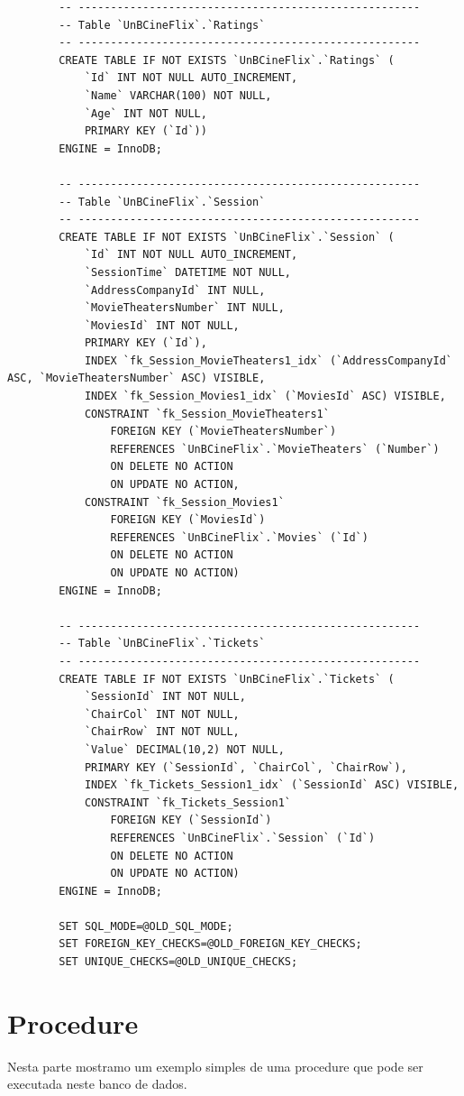 \documentclass[a4paper,10pt]{article}
\begin{document}
\begin{lstlisting}
		-- -----------------------------------------------------
		-- Table `UnBCineFlix`.`Ratings`
		-- -----------------------------------------------------
		CREATE TABLE IF NOT EXISTS `UnBCineFlix`.`Ratings` (
			`Id` INT NOT NULL AUTO_INCREMENT,
			`Name` VARCHAR(100) NOT NULL,
			`Age` INT NOT NULL,
			PRIMARY KEY (`Id`))
		ENGINE = InnoDB;

		-- -----------------------------------------------------
		-- Table `UnBCineFlix`.`Session`
		-- -----------------------------------------------------
		CREATE TABLE IF NOT EXISTS `UnBCineFlix`.`Session` (
			`Id` INT NOT NULL AUTO_INCREMENT,
			`SessionTime` DATETIME NOT NULL,
			`AddressCompanyId` INT NULL,
			`MovieTheatersNumber` INT NULL,
			`MoviesId` INT NOT NULL,
			PRIMARY KEY (`Id`),
			INDEX `fk_Session_MovieTheaters1_idx` (`AddressCompanyId` ASC, `MovieTheatersNumber` ASC) VISIBLE,
			INDEX `fk_Session_Movies1_idx` (`MoviesId` ASC) VISIBLE,
			CONSTRAINT `fk_Session_MovieTheaters1`
				FOREIGN KEY (`MovieTheatersNumber`)
				REFERENCES `UnBCineFlix`.`MovieTheaters` (`Number`)
				ON DELETE NO ACTION
				ON UPDATE NO ACTION,
			CONSTRAINT `fk_Session_Movies1`
				FOREIGN KEY (`MoviesId`)
				REFERENCES `UnBCineFlix`.`Movies` (`Id`)
				ON DELETE NO ACTION
				ON UPDATE NO ACTION)
		ENGINE = InnoDB;

		-- -----------------------------------------------------
		-- Table `UnBCineFlix`.`Tickets`
		-- -----------------------------------------------------
		CREATE TABLE IF NOT EXISTS `UnBCineFlix`.`Tickets` (
			`SessionId` INT NOT NULL,
			`ChairCol` INT NOT NULL,
			`ChairRow` INT NOT NULL,
			`Value` DECIMAL(10,2) NOT NULL,
			PRIMARY KEY (`SessionId`, `ChairCol`, `ChairRow`),
			INDEX `fk_Tickets_Session1_idx` (`SessionId` ASC) VISIBLE,
			CONSTRAINT `fk_Tickets_Session1`
				FOREIGN KEY (`SessionId`)
				REFERENCES `UnBCineFlix`.`Session` (`Id`)
				ON DELETE NO ACTION
				ON UPDATE NO ACTION)
		ENGINE = InnoDB;

		SET SQL_MODE=@OLD_SQL_MODE;
		SET FOREIGN_KEY_CHECKS=@OLD_FOREIGN_KEY_CHECKS;
		SET UNIQUE_CHECKS=@OLD_UNIQUE_CHECKS;
\end{lstlisting}

\section{Procedure}

Nesta parte mostramo um exemplo simples de uma procedure que pode ser executada neste banco de dados.

\begin{lstlisting}

\end{lstlisting}
\end{document}
